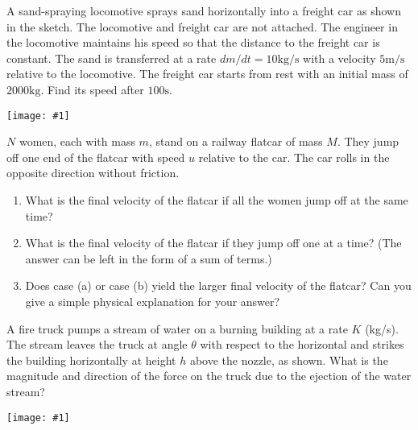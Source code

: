 \documentclass[12pt,letterpaper]{hmcpset}
\newcommand{\diagram}[1]{\begin{center}\texttt{[image: \#1]}\end{center}}
\begin{document}

\begin{problem}
    A sand-spraying locomotive sprays sand
    horizontally into a freight car as shown
    in the sketch. The locomotive and freight
    car are not attached. The engineer in the
    locomotive maintains his speed so that the
    distance to the freight car is constant.
    The sand is transferred at a rate $dm/dt =
    10\text{kg/s}$ with a velocity $5\text{m/s}$
    relative to the locomotive. The freight car
    starts from rest with an initial mass of
    $2000\text{kg}$. Find its speed after
    $100\text{s}$.

    \diagram{img/4_13.png}

\end{problem}

\begin{solution}
    \vfill
\end{solution}
\clearpage


\begin{problem}
    $N$ women, each with mass $m$, stand
    on a railway flatcar of mass $M$. They
    jump off one end of the flatcar with
    speed $u$ relative to the car. The car
    rolls in the opposite direction without
    friction.

    \begin{enumerate}
    \item What is the final velocity of the
        flatcar if all the women jump off
        at the same time?
    \item What is the final velocity of the
        flatcar if they jump off one at a time?
        (The answer can be left in the form
        of a sum of terms.)
    \item Does case (a) or case (b) yield the
        larger final velocity of the flatcar?
        Can you give a simple physical
        explanation for your answer?
    \end{enumerate}
\end{problem}

\begin{solution}
    \vfill
\end{solution}
\clearpage


\begin{problem}
    A fire truck pumps a stream of water
    on a burning building at a rate $K$ (kg/s).
    The stream leaves the truck at angle $\theta$
    with respect to the horizontal and strikes
    the building horizontally at height $h$
    above the nozzle, as shown. What is the
    magnitude and direction of the force on
    the truck due to the ejection of the water
    stream?

    \diagram{img/4_21.png}
\end{problem}
\end{document}
